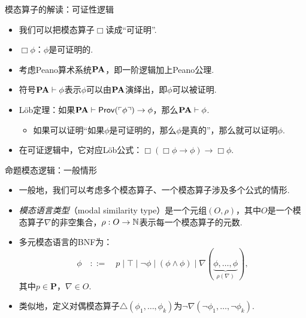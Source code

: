     \begin{frame}{模态算子的解读：可证性逻辑}
    \begin{itemize}
        \item 我们可以把模态算子$\Box$读成“可证明”.
        \item $\Box\phi$：$\phi$是可证明的.
        \item 考虑Peano算术系统$\mathbf{PA}$，即一阶逻辑加上Peano公理.
        \item 符号$\mathbf{PA}\vdash \phi$表示$\phi$可以由$\mathbf{PA}$演绎出，即$\phi$可以被证明.
        \item Löb定理：如果$\mathbf{PA}\vdash\mathsf{Prov}(\ulcorner\phi\urcorner)\to\phi$，那么$\mathbf{PA}\vdash\phi$.
        \begin{itemize}
            \item 如果可以证明“如果$\phi$是可证明的，那么$\phi$是真的”，那么就可以证明$\phi$.
        \end{itemize}
        \item 在可证逻辑中，它对应Löb公式：$\Box(\Box\phi\to\phi)\to\Box\phi$.
    \end{itemize}
    \end{frame}
    
    \begin{frame}{命题模态逻辑：一般情形}
    \begin{itemize}
        \item 一般地，我们可以考虑多个模态算子、一个模态算子涉及多个公式的情形.
        \item \emph{模态语言类型}（modal similarity type）是一个元组$(O,\rho)$，其中$O$是一个模态算子$\nabla$的非空集合，$\rho:O\to\mathbb{N}$表示每一个模态算子的元数.
        \item 多元模态语言的BNF为：
        \[\phi\quad::=\quad p\mid \top\mid \neg\phi\mid (\phi\wedge\phi)\mid \nabla(\underbrace{\phi,\dots,\phi}_{\rho(\nabla)}),\]
        其中$p\in \mathbf P$，$\nabla\in O$.
        \item 类似地，定义对偶模态算子$\triangle(\phi_1,\dots,\phi_k)$为$\neg\nabla(\neg\phi_1,\dots,\neg\phi_k)$.
    \end{itemize}
    \end{frame}
    
